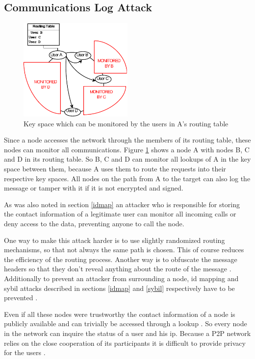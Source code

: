 \documentclass[a4paper,conference]{IEEEtran}
\begin{document}
\subsection{Communications Log Attack}
\label{comlog}
\begin{figure}
\centering
\includegraphics[width=0.5\textwidth]{log}

\caption{Key space which can be monitored by the users in A's routing table
\cite{touceda}}
\label{fig:log}
\end{figure}
Since a node accesses the network through the members of its routing table,
these nodes can monitor all communications. Figure \ref{fig:log} shows a node A
with
nodes B, C and D in its routing table. So
B, C and D can monitor all lookups of A in the key space between them, because A
uses them to route the requests into their respective key spaces. All
nodes on the path from A to the target can also log the message or tamper with
it if it is not encrypted and signed.

As was also noted in section \ref{idmap} an attacker who is responsible for
storing the contact information of a legitimate user can monitor all
incoming calls or deny access to the data, preventing anyone to call the node.

One way to make this attack harder is to use slightly randomized routing
mechanisms, so that not always the same path is chosen. This of course
reduces the efficiency of the routing process. Another way is to obfuscate the
message headers so that they don't reveal anything about the route of
the message \cite{touceda}.
Additionally to prevent an attacker from surrounding a node, id mapping and
sybil attacks described in sections \ref{idmap} and \ref{sybil} respectively
have
to be prevented \cite{touceda}.

Even if all these nodes were trustworthy the contact information of a node is
publicly available and can trivially be accessed through a lookup
\cite{koskelaold}.
So every node in the network can inquire the status of a user and his ip.
Because a P2P network relies on the close cooperation of its participants
it is difficult to provide privacy for the users \cite{koskelaold}.
\end{document}
